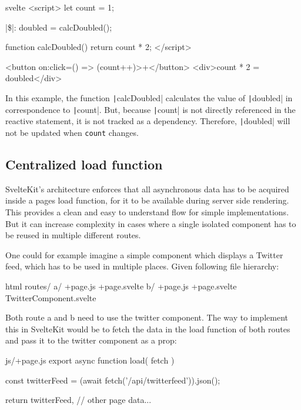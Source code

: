 \begin{myminted}[escapeinside=||, autogobble]{svelte}{}
<script>
    let count = 1;

    |\$|: doubled = calcDoubled();

    function calcDoubled() {
        return count * 2;
    }
</script>

<button on:click={() => (count++)}>+</button>
<div>{count} * 2 = {doubled}</div>
\end{myminted}

In this example, the function \texttt|calcDoubled| calculates the value of \texttt|doubled| in correspondence to \texttt|count|. But, because \texttt|count| is not directly referenced in the reactive statement, it is not tracked as a dependency. Therefore, \texttt|doubled| will not be updated when \texttt{count} changes.

\subsection{Centralized load function}
SvelteKit's architecture enforces that all asynchronous data has to be acquired inside a pages load function, for it to be available during server side rendering. This provides a clean and easy to understand flow for simple implementations. But it can increase complexity in cases where a single isolated component has to be reused in multiple different routes.

One could for example imagine a simple component which displays a Twitter feed, which has to be used in multiple places. Given following file hierarchy:

\begin{myminted}{html}{}
routes/
  a/
    +page.js
    +page.svelte
  b/
    +page.js
    +page.svelte
  TwitterComponent.svelte
\end{myminted}

Both route a and b need to use the twitter component. The way to implement this in SvelteKit would be to fetch the data in the load function of both routes and pass it to the twitter component as a prop:

\begin{myminted}{js}{/+page.js}
export async function load({ fetch }) {

    const twitterFeed = (await fetch('/api/twitterfeed')).json();

    return {
        twitterFeed,
        // other page data...
    }
}

\end{myminted}

